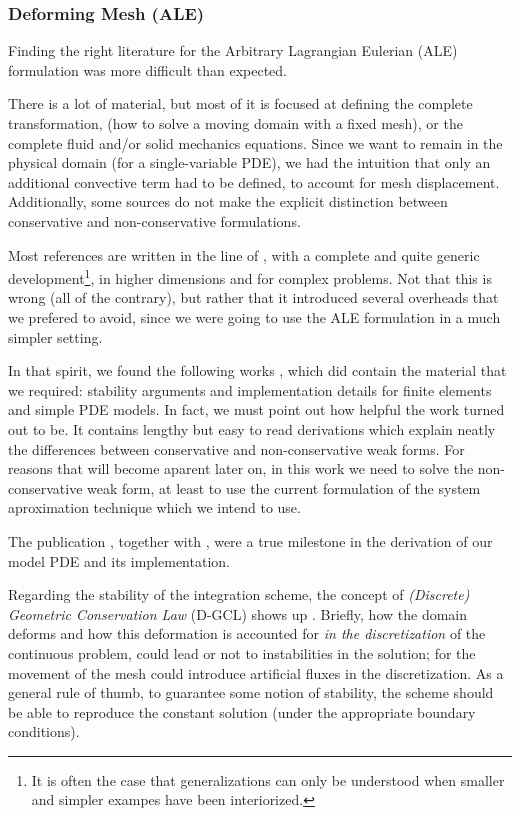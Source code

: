 \documentclass[thesis.tex]{subfiles}
\begin{document}
\subsubsection{Deforming Mesh (ALE)}
Finding the right literature for the Arbitrary Lagrangian Eulerian (ALE) formulation 
was more difficult than expected.

There is a lot of material, 
but most of it is focused at defining the complete transformation,
(how to solve a moving domain with a fixed mesh),
or the complete fluid and/or solid mechanics equations.
Since we want to remain in the physical domain
(for a \mbox{single-variable} PDE),
we had the intuition that only
an additional convective term had to be defined, 
to account for mesh displacement.
Additionally, some sources do not make the explicit distinction between
conservative and non-conservative formulations.

Most references are written in the line of 
\cite{doneaALE,
DONEA1982689},
with a complete and quite generic development\footnote{
    It is often the case that generalizations can only be understood
    when smaller and simpler exampes have been interiorized.
}, 
in higher dimensions and for complex problems.
Not that this is wrong 
(all of the contrary), 
but rather that it introduced several overheads that we prefered to avoid,
since we were going to use the ALE formulation in a much simpler setting.

In that spirit, 
we found the following works 
\cite{formaggiaALE,
formaggiaALE_secondOrder,
FSIPistonProblem},
which did contain the material that we required:
stability arguments and implementation details for finite elements
and simple PDE models.
In fact, we must point out how helpful the work \cite{formaggiaALE}
turned out to be.
It contains lengthy but easy to read derivations which explain neatly
the differences between conservative and non-conservative weak forms.
For reasons that will become aparent later on,
in this work we need to solve the non-conservative weak form,
at least to use the current formulation of the system aproximation technique which 
we intend to use.

The publication \cite{formaggiaALE}, together with \cite{FSIPistonProblem}, 
were a true milestone in the derivation of our model PDE and its implementation.

Regarding the stability of the integration scheme,
the concept of \textit{(Discrete) Geometric Conservation Law} (D-GCL) shows up 
\cite{HUGHES2000467,
GUILLARD20001467,
FARHAT2001669,
LESOINNE199671}.
Briefly, how the domain deforms and how this deformation is accounted for
\textit{in the discretization} of the continuous problem,
could lead or not to instabilities in the solution; 
for the movement of the mesh could introduce artificial fluxes in the discretization.
As a general rule of thumb, 
to guarantee some notion of stability,
the scheme should be able to reproduce the constant solution 
(under the appropriate boundary conditions).
\end{document}
